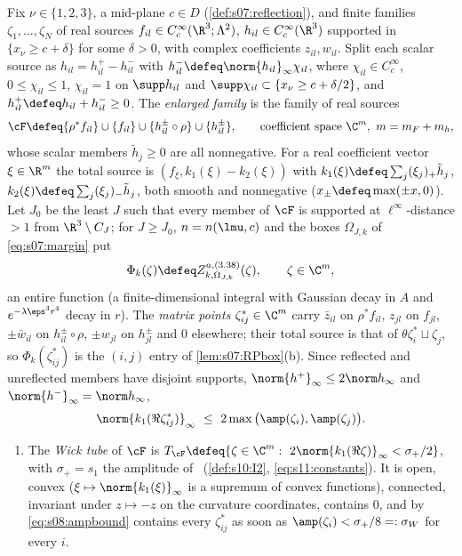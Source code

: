 \begin{definition}\label{def:s08:enlarged}
Fix $\nu\in\{1,2,3\}$, a mid-plane $c\in D$ (\cref{def:s07:reflection}), and finite families $\zeta_1,\dots,\zeta_N$ of real sources $f_{il}\in C^\infty_c(\R^3;\Lambda^2)$, $h_{il}\in C^\infty_c(\R^3)$ supported in $\{x_\nu\ge c+\delta\}$ for some $\delta>0$, with complex coefficients $z_{il},w_{il}$. Split each scalar source as $h_{il}=h^+_{il}-h^-_{il}$ with $h^-_{il}\defeq\norm{h_{il}}_\infty\chi_{il}$, where $\chi_{il}\in C^\infty_c$, $0\le\chi_{il}\le1$, $\chi_{il}=1$ on $\supp h_{il}$ and $\supp\chi_{il}\subset\{x_\nu\ge c+\delta/2\}$, and $h^+_{il}\defeq h_{il}+h^-_{il}\ge0$. The \emph{enlarged family} is the family of real sources
\[
\cF\defeq\{\rho^*f_{il}\}\cup\{f_{il}\}\cup\{h^\pm_{il}\circ\rho\}\cup\{h^\pm_{il}\},\qquad\text{coefficient space }\C^m,\ m=m_F+m_h ,
\]
whose scalar members $\tilde h_j\ge0$ are all nonnegative. For a real coefficient vector $\xi\in\R^m$ the total source is $(f_\xi,k_1(\xi)-k_2(\xi))$ with $k_1(\xi)\defeq\sum_j(\xi_j)_+\tilde h_j$, $k_2(\xi)\defeq\sum_j(\xi_j)_-\tilde h_j$, both smooth and nonnegative ($x_\pm\defeq\max(\pm x,0)$). Let $J_0$ be the least $J$ such that every member of $\cF$ is supported at $\ell^\infty$-distance $>1$ from $\R^3\setminus C_J$; for $J\ge J_0$, $n=n(\lmu,c)$ and the boxes $\Omega_{J,k}$ of \eqref{eq:s07:margin} put
\[
\Phi_k(\zeta)\defeq Z^{a,(3.38)}_{k,\Omega_{J,k}}(\zeta),\qquad\zeta\in\C^m ,
\]
an entire function (a finite-dimensional integral with Gaussian decay in $A$ and $e^{-\lambda\eps^3r^4}$ decay in $r$). The \emph{matrix points} $\zeta^*_{ij}\in\C^m$ carry $\bar z_{il}$ on $\rho^*f_{il}$, $z_{jl}$ on $f_{jl}$, $\pm\bar w_{il}$ on $h^\pm_{il}\circ\rho$, $\pm w_{jl}$ on $h^\pm_{jl}$ and $0$ elsewhere; their total source is that of $\theta\zeta_i^*\sqcup\zeta_j$, so $\Phi_k(\zeta^*_{ij})$ is the $(i,j)$ entry of \cref{lem:s07:RPbox}(b). Since reflected and unreflected members have disjoint supports, $\norm{h^+}_\infty\le2\norm h_\infty$ and $\norm{h^-}_\infty=\norm h_\infty$,
\begin{equation}\label{eq:s08:ampbound}
\norm{k_1(\Re\zeta^*_{ij})}_\infty\ \le\ 2\max\big(\amp(\zeta_i),\amp(\zeta_j)\big).
\end{equation}
\begin{enumerate}[label=\textup{(\roman*)},leftmargin=*,nosep]
\item The \emph{Wick tube} of $\cF$ is $T_\cF\defeq\{\zeta\in\C^m:\ 2\norm{k_1(\Re\zeta)}_\infty<\sigma_+/2\}$, with $\sigma_+=s_1$ the amplitude of \Itwo\ (\cref{def:s10:I2}, \eqref{eq:s11:constants}). It is open, convex ($\xi\mapsto\norm{k_1(\xi)}_\infty$ is a supremum of convex functions), connected, invariant under $z\mapsto-z$ on the curvature coordinates, contains $0$, and by \eqref{eq:s08:ampbound} contains every $\zeta^*_{ij}$ as soon as $\amp(\zeta_i)<\sigma_+/8=:\sigma_W$ for every $i$.

\end{enumerate}
\end{definition}
